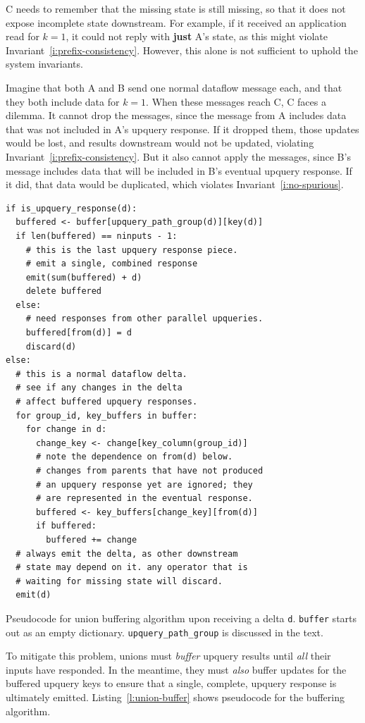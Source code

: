 C needs to remember that the missing state is still missing, so that it does not
expose incomplete state downstream. For example, if it received an application
read for $k = 1$, it could not reply with \textbf{just} A's state, as this might
violate Invariant~\ref{i:prefix-consistency}. However, this alone is not
sufficient to uphold the system invariants.

Imagine that both A and B send one normal dataflow message each, and that they
both include data for $k = 1$. When these messages reach C, C faces a dilemma.
It cannot drop the messages, since the message from A includes data that was not
included in A's upquery response. If it dropped them, those updates would be
lost, and results downstream would not be updated, violating
Invariant~\ref{i:prefix-consistency}. But it also cannot apply the messages,
since B's message includes data that will be included in B's eventual upquery
response. If it did, that data would be duplicated, which violates
Invariant~\ref{i:no-spurious}.

\begin{listing}
  \begin{verbatim}
if is_upquery_response(d):
  buffered <- buffer[upquery_path_group(d)][key(d)]
  if len(buffered) == ninputs - 1:
    # this is the last upquery response piece.
    # emit a single, combined response
    emit(sum(buffered) + d)
    delete buffered
  else:
    # need responses from other parallel upqueries.
    buffered[from(d)] = d
    discard(d)
else:
  # this is a normal dataflow delta.
  # see if any changes in the delta
  # affect buffered upquery responses.
  for group_id, key_buffers in buffer:
    for change in d:
      change_key <- change[key_column(group_id)]
      # note the dependence on from(d) below.
      # changes from parents that have not produced
      # an upquery response yet are ignored; they
      # are represented in the eventual response.
      buffered <- key_buffers[change_key][from(d)]
      if buffered:
        buffered += change
  # always emit the delta, as other downstream
  # state may depend on it. any operator that is
  # waiting for missing state will discard.
  emit(d)
  \end{verbatim}
  \caption{Pseudocode for union buffering algorithm upon receiving a delta
  \texttt{d}. \texttt{buffer} starts out as an empty dictionary.
  \texttt{upquery\_path\_group} is discussed in the text.}
  \label{l:union-buffer}
\end{listing}

To mitigate this problem, unions must \textit{buffer} upquery results until
\emph{all} their inputs have responded. In the meantime, they must \emph{also}
buffer updates for the buffered upquery keys to ensure that a single, complete,
upquery response is ultimately emitted. Listing~\vref{l:union-buffer} shows
pseudocode for the buffering algorithm.

